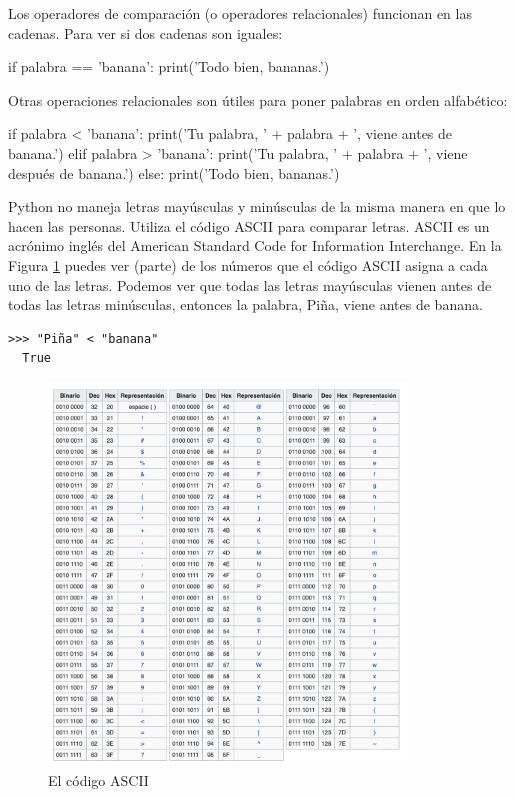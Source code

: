  


Los operadores de comparación (o operadores relacionales) funcionan en las cadenas.  Para ver si dos cadenas son iguales:

\begin{python}[frame=single]
if palabra == 'banana':
    print('Todo bien, bananas.')
\end{python}
%
Otras operaciones relacionales son útiles para poner palabras en orden
alfabético:

\begin{python}[frame=single]
if palabra < 'banana':
    print('Tu palabra, ' + palabra + ', viene antes de banana.')
elif palabra > 'banana':
    print('Tu palabra, ' + palabra + ', viene después de banana.')
else:
    print('Todo bien, bananas.')
\end{python}
%
Python no maneja letras mayúsculas y minúsculas de la misma manera en que
lo hacen las personas. Utiliza el código ASCII para comparar letras.
ASCII es un acrónimo inglés del American 
Standard 
Code for 
Information Interchange. 
En la Figura \ref{fig:ASCII} puedes ver (parte) de los números que el código ASCII asigna a cada uno de las letras.
Podemos ver que todas las letras mayúsculas vienen antes de todas las
letras minúsculas, entonces la palabra, Piña, viene antes de banana.

\begin{Verbatim}[frame=single]
>>> "Piña" < "banana"
  True
\end{Verbatim}


\begin{figure}[t]
    \centering
    \includegraphics[width=0.85\textwidth]{images/ASCII.png}
    \caption{El código ASCII}
    \label{fig:ASCII}
\end{figure}

